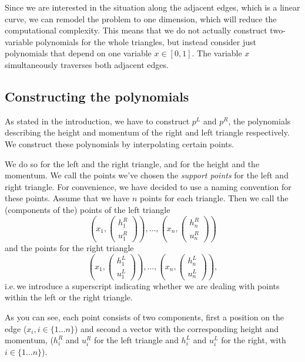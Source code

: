 \documentclass{article}
\begin{document}
Since we are interested in the situation along the adjacent edges, which is a linear curve, we can remodel the problem to one dimension, which will reduce the computational complexity. This means that we do not actually construct two-variable polynomials for the whole triangles, but instead consider just polynomials that depend on one variable $x \in [0,1]$. The variable $x$ simultaneously traverses both adjacent edges.

\subsection{Constructing the polynomials}
\label{sec:constructing-polynomials}

As stated in the introduction, we have to construct $p^L$ and $p^R$, the polynomials describing the height and momentum of the right and left triangle respectively. We construct these polynomials by interpolating certain points.

We do so for the left and the right triangle, and for the height and the momentum. We call the points we've chosen the \emph{support points} for the left and right triangle. For convenience, we have decided to use a naming convention for these points. Assume that we have $n$ points for each triangle. Then we call the (components of the) points of the left triangle 
\begin{equation*}
\left(x_1,\begin{pmatrix}
    h_1^R \\ u_1^R
  \end{pmatrix}\right), \dots , \left(x_n, \begin{pmatrix}
    h_n^R \\ u_n^R
  \end{pmatrix}\right)
\end{equation*}
and the points for the right triangle 
\begin{equation*}
\left(x_1,\begin{pmatrix}
    h_1^L \\ u_1^L
  \end{pmatrix}\right), \dots , \left(x_n,\begin{pmatrix}
    h_n^L \\ u_n^L
  \end{pmatrix}\right),
\end{equation*}
i.e.\,we introduce a superscript indicating whether we are dealing with points within the left or the right triangle.

As you can see, each point consists of two components, first a position on the edge ($x_i, i \in \{1 \dots n\}$) and second a vector with the corresponding height and momentum, ($h_i^R$ and $u_i^R$ for the left triangle and $h_i^L$ and $u_i^L$ for the right, with $i \in \{1 \dots n\}$).
\end{document}
